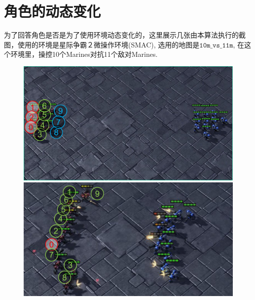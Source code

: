 \section{角色的动态变化}\label{sec:dynamic-role}

为了回答角色是否是为了使用环境动态变化的，这里展示几张由本算法执行的截图，使用的环境是星际争霸２微操作环境(SMAC), 选用的地图是$\mathtt{10m\_vs\_11m}$, 在这个环境里，操控10个Marines对抗11个敌对Marines. 

\begin{figure}
    \centering
    \includegraphics[height=0.24\linewidth]{figures/dynamic/10m_vs_11m-g1.pdf}\hfill
    \includegraphics[height=0.24\linewidth]{figures/dynamic/10m_vs_11m-g2.pdf}\\
    \hfill
    \\


\end{figure}
